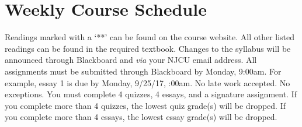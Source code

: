 \documentclass[article,oneside]{memoir}
\begin{document}
\section{Weekly Course Schedule}
Readings marked with a `**' can be found on the course website. All other listed readings can be found in the required textbook. Changes to the syllabus will be announced through Blackboard and \emph{via} your NJCU email address.  All assignments must be submitted through Blackboard by Monday, 9:00am. For example, essay 1 is due by Monday, 9/25/17, :00am. No late work accepted. No exceptions. You must complete 4 quizzes, 4 essays, and a signature assignment.  If you complete more than 4 quizzes, the lowest quiz grade(s) will be dropped. If you complete more than 4 essays, the lowest essay grade(s) will be dropped.   \newline
\end{document}
